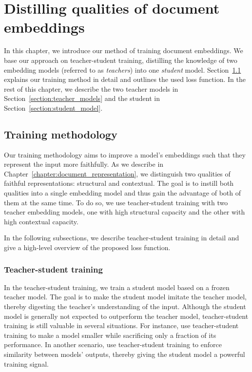 \chapter{Distilling qualities of document embeddings}\label{chapter:training_method}

In this chapter, we introduce our method of training document embeddings. We
base our approach on teacher-student training, distilling the knowledge of two
embedding models (referred to as \emph{teachers}) into one \emph{student}
model. Section~\ref{section:training_method} explains our training method in
detail and outlines the used loss function. In the rest of this chapter, we
describe the two teacher models in Section~\ref{section:teacher_models} and the
student in Section~\ref{section:student_model}.

\section{Training methodology}\label{section:training_method}

Our training methodology aims to improve a model's embeddings such that they represent the input more faithfully. As we describe in
Chapter~\ref{chapter:document_representation}, we distinguish two qualities of
faithful representations: structural and contextual. The goal is to instill
both qualities into a single embedding model and thus gain the advantage of both of them at the same time. To do so, we use teacher-student
training with two teacher embedding models, one with high structural capacity
and the other with high contextual capacity.

In the following subsections, we describe teacher-student training in detail
and give a high-level overview of the proposed loss function.

\subsection{Teacher-student training}

In the teacher-student training, we train a student model based on a frozen
teacher model. The goal is to make the student model imitate the teacher model,
thereby digesting the teacher's understanding of the input. Although the
student model is generally not expected to outperform the teacher model,
teacher-student training is still valuable in several situations. For instance,
\cite{sanh2019distilbert} use teacher-student training to make a model smaller
while sacrificing only a fraction of its performance. In another scenario,
\cite{reimers2020making} use teacher-student training to enforce similarity
between models' outputs, thereby giving the student model a powerful training
signal.

